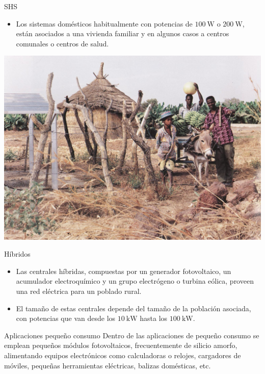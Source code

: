 \documentclass[xcolor={usenames,svgnames,dvipsnames}]{beamer}
\begin{document}
\begin{frame}[label={sec:org18a997c}]{SHS}
\begin{itemize}
\item Los sistemas domésticos habitualmente con potencias de
\(\SI{100}{\watt}\) o \(\SI{200}{\watt}\), están asociados a una
vivienda familiar y en algunos casos a centros comunales o centros
de salud.
\end{itemize}

\begin{center}
\includegraphics[width=.9\linewidth]{../figs/er.jpg}
\end{center}
\end{frame}


\begin{frame}[label={sec:org514394f}]{Híbridos}
\begin{itemize}
\item Las centrales híbridas, compuestas por un generador fotovoltaico, un
acumulador electroquímico y un grupo electrógeno o turbina eólica,
proveen una red eléctrica para un poblado rural.

\item El tamaño de estas centrales depende del tamaño de la población
asociada, con potencias que van desde los \(\SI{10}{\kilo\watt}\)
hasta los \(\SI{100}{\kilo\watt}\).
\end{itemize}
\end{frame}

\begin{frame}[label={sec:org0ab7c2a}]{Aplicaciones pequeño consumo}
Dentro de las aplicaciones de pequeño consumo se emplean pequeños
módulos fotovoltaicos, frecuentemente de silicio amorfo, alimentando
equipos electrónicos como calculadoras o relojes, cargadores de
móviles, pequeñas herramientas eléctricas, balizas domésticas, etc.
\end{frame}
\end{document}
